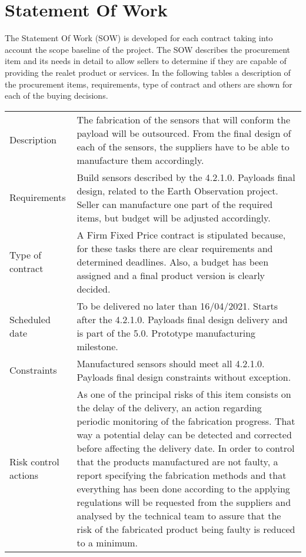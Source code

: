 \section{Statement Of Work}
The Statement Of Work (SOW) is developed for each contract taking into account the scope baseline of the project. The SOW describes the procurement item and its needs in detail to allow sellers to determine if they are capable of providing the realet product or services.
In the following tables a description of the procurement items, requirements, type of contract and others are shown for each of the buying decisions.
\begin{table}[H]
	\centering
	\begin{tabular}
		{>{\raggedright\arraybackslash}p{3cm} >{\arraybackslash}p{11cm}}
		
		\toprule[2pt]
		
		\multicolumn{2}{c}{\textbf{SOW - 5.1.1. Manufacturing of payload sensors}}\\
		
		\midrule[1.5pt]
		
		Description & The fabrication of the sensors that will conform the payload will be outsourced. From the final design of each of the sensors, the suppliers have to be able to manufacture them accordingly. \\
		\hline
		
		Requirements & Build sensors described by the 4.2.1.0. Payloads final design, related to the Earth Observation project. Seller can manufacture one part of the required items, but budget will be adjusted accordingly.\\
		\hline
		
		Type of contract & A Firm Fixed Price contract is stipulated because, for these tasks there are clear requirements and determined deadlines. Also, a budget has been assigned and a final product version is clearly decided.\\
		\hline
		
		Scheduled date & To be delivered no later than 16/04/2021. Starts after the 4.2.1.0. Payloads final design delivery and is part of the 5.0. Prototype manufacturing milestone.\\
		\hline
		
		Constraints & Manufactured sensors should meet all 4.2.1.0. Payloads final design constraints without exception.\\
		\hline
		
		Risk control actions & As one of the principal risks of this item consists on the delay of the delivery, an action regarding periodic monitoring of the fabrication progress. That way a potential delay can be detected and corrected before affecting the delivery date.
		In order to control that the products manufactured are not faulty, a report specifying the fabrication methods and that everything has been done according to the applying regulations will be requested from the suppliers and analysed by the technical team to assure that the risk of the fabricated product being faulty is reduced to a minimum.\\
		\hline
		

\end{tabular}
\end{table}
